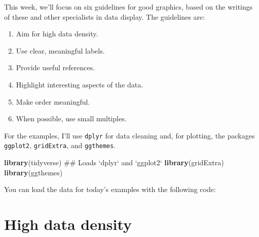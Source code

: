 \documentclass[]{book}
\makeatletter
\newenvironment{Shaded}{\begin{snugshade}}{\end{snugshade}}
\newcommand{\KeywordTok}[1]{\textcolor[rgb]{0.13,0.29,0.53}{\textbf{#1}}}
\newcommand{\DecValTok}[1]{\textcolor[rgb]{0.00,0.00,0.81}{#1}}
\newcommand{\StringTok}[1]{\textcolor[rgb]{0.31,0.60,0.02}{#1}}
\newcommand{\OperatorTok}[1]{\textcolor[rgb]{0.81,0.36,0.00}{\textbf{#1}}}
\newcommand{\NormalTok}[1]{#1}
\providecommand{\tightlist}{%
  \setlength{\itemsep}{0pt}\setlength{\parskip}{0pt}}
\newenvironment{kframe}{%
\medskip{}
\setlength{\fboxsep}{.8em}
 \def\at@end@of@kframe{}%
 \ifinner\ifhmode%
  \def\at@end@of@kframe{\end{minipage}}%
  \begin{minipage}{\columnwidth}%
 \fi\fi%
 \def\FrameCommand##1{\hskip\@totalleftmargin \hskip-\fboxsep
 \colorbox{shadecolor}{##1}\hskip-\fboxsep
     \hskip-\linewidth \hskip-\@totalleftmargin \hskip\columnwidth}%
 \MakeFramed {\advance\hsize-\width
   \@totalleftmargin\z@ \linewidth\hsize
   \@setminipage}}%
 {\par\unskip\endMakeFramed%
 \at@end@of@kframe}
\renewenvironment{Shaded}{\begin{kframe}}{\end{kframe}}
\theoremstyle{definition}
\theoremstyle{definition}
\theoremstyle{definition}
\theoremstyle{remark}
\makeatother
\begin{document}
This week, we'll focus on six guidelines for good graphics, based on the
writings of these and other specialists in data display. The guidelines
are:

\begin{enumerate}
\def\labelenumi{\arabic{enumi}.}
\tightlist
\item
  Aim for high data density.
\item
  Use clear, meaningful labels.
\item
  Provide useful references.
\item
  Highlight interesting aspects of the data.
\item
  Make order meaningful.
\item
  When possible, use small multiples.
\end{enumerate}

For the examples, I'll use \texttt{dplyr} for data cleaning and, for
plotting, the packages \texttt{ggplot2}, \texttt{gridExtra}, and
\texttt{ggthemes}.

\begin{Shaded}
\begin{Highlighting}[]
\KeywordTok{library}\NormalTok{(tidyverse) ## Loads `dplyr` and `ggplot2`}
\KeywordTok{library}\NormalTok{(gridExtra)}
\KeywordTok{library}\NormalTok{(ggthemes)}
\end{Highlighting}
\end{Shaded}

You can load the data for today's examples with the following code:

\begin{Shaded}
\end{Shaded}

\section{High data density}\label{high-data-density}
\end{document}
